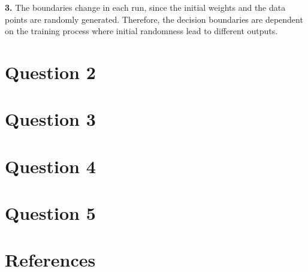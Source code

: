 \documentclass{assignment}
\begin{document}
\textbf{3.}
The boundaries change in each run, since the initial weights and the data points are randomly generated. Therefore, the decision boundaries are dependent on the training process where initial randomness lead to different outputs.


\section{Question 2}

\section{Question 3}

\section{Question 4}

\section{Question 5}




\newpage
\section{References}
\nocite{*} 
   
     
\end{document}
